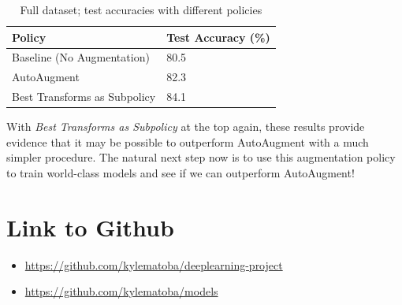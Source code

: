 \documentclass[10pt,twocolumn,letterpaper]{article}
\begin{document}
		\begin{table}[h]
			\begin{tabular}{l|l}
				\hline
				Policy  						&Test Accuracy (\%)   \\ \hline
				Baseline (No Augmentation)  	&80.5 \\
				AutoAugment 					&82.3 \\ 
				Best Transforms as Subpolicy	&84.1 \\	

			\end{tabular}
			\caption{Full dataset; test accuracies with different policies}
		\end{table}

		With \textit{Best Transforms as Subpolicy} at the top again, these results provide evidence that it may be possible to outperform AutoAugment with a much simpler procedure. The natural next step now is to use this augmentation policy to train world-class models and see if we can outperform AutoAugment!
		

	
\section{Link to Github}

	\begin{itemize}
	\item \url{https://github.com/kylematoba/deeplearning-project}
	\item \url{https://github.com/kylematoba/models}
	\end{itemize}


\nocite{Torralba2008}
{\small


}
\end{document}
